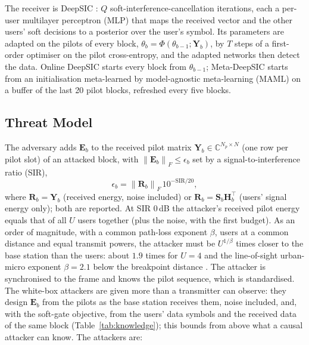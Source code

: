 \documentclass[journal]{IEEEtran}
\theoremstyle{remark}
\newcommand{\norm}[1]{\left\lVert #1 \right\rVert}
\begin{document}
The receiver is DeepSIC \cite{shlezinger2021}: $Q$ soft-interference-cancellation iterations,
each a per-user multilayer perceptron (MLP) that maps the received vector and the other users' soft
decisions to a posterior over the user's symbol. Its parameters are adapted on the pilots of
every block, $\theta_b=\Phi(\theta_{b-1};\bm Y_b)$, by $T$ steps of a first-order optimiser on the
pilot cross-entropy, and the adapted networks then detect the data. Online DeepSIC starts every block from
$\theta_{b-1}$; Meta-DeepSIC \cite{raviv2023} starts from an initialisation meta-learned by model-agnostic meta-learning (MAML) \cite{finn2017} on a
buffer of the last 20 pilot blocks, refreshed every five blocks.

\subsection{Threat Model}
The adversary adds $\bm E_b$ to the received pilot matrix $\bm Y_b\in\mathbb{C}^{N_p\times N}$ (one row per pilot slot) of an
attacked block, with $\norm{\bm E_b}_F\le\epsilon_b$ set by a signal-to-interference ratio (SIR),
\begin{equation}\label{eq:budget}
\epsilon_b=\norm{\bm R_b}_F\,10^{-\mathrm{SIR}/20},
\end{equation}
where $\bm R_b=\bm Y_b$ (received energy, noise included) or $\bm R_b=\bm
S_b\bm H_b^{\!\top}$ (users' signal energy only); both are reported. At SIR $0$\,dB the attacker's
received pilot energy equals that of all $U$ users together (plus the noise, with the first budget).
As an order of magnitude, with a common path-loss exponent $\beta$, users at a common distance and
equal transmit powers, the attacker must be $U^{1/\beta}$ times closer to the base station than the
users: about $1.9$ times for $U=4$ and the line-of-sight urban-micro exponent $\beta=2.1$ below the
breakpoint distance \cite{tr38901}. The attacker is synchronised to the frame and knows the pilot sequence, which is
standardised. The white-box attackers are given more than a transmitter can observe: they design $\bm E_b$ from the pilots as the base station receives them, noise included, and, with the soft-gate objective, from the users' data symbols and the received data of the same block (Table~\ref{tab:knowledge}); this bounds from above what a causal attacker can know. The attackers are:
\end{document}
